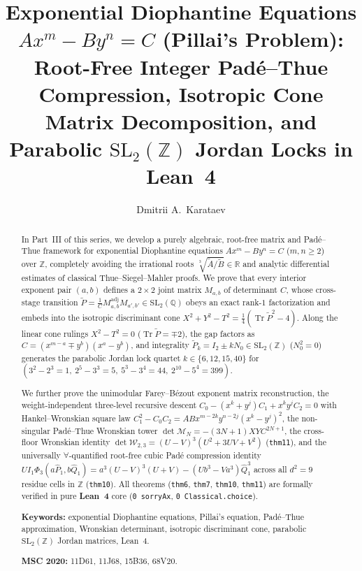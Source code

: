 \documentclass[11pt,a4paper]{article}
\title{\textbf{Exponential Diophantine Equations $A x^m - B y^n = C$ (Pillai's Problem):\\ Root-Free Integer Pad\'e--Thue Compression, Isotropic Cone Matrix Decomposition, and Parabolic $\mathrm{SL}_2(\mathbb{Z})$ Jordan Locks in Lean~4}}
\author{Dmitrii A.~Karataev}
\date{}
\theoremstyle{plain}
\theoremstyle{definition}
\begin{document}
\maketitle

\begin{abstract}
In Part~III of this series, we develop a purely algebraic, root-free matrix and Pad\'e--Thue framework for exponential Diophantine equations $A x^m - B y^n = C$ ($m,n\ge 2$) over $\mathbb{Z}$, completely avoiding the irrational roots $\sqrt[3]{\widetilde{A}/\widetilde{B}}\in\mathbb{R}$ and analytic differential estimates of classical Thue--Siegel--Mahler proofs. We prove that every interior exponent pair $(a,b)$ defines a $2\times 2$ joint matrix $M_{a,b}$ of determinant $C$, whose cross-stage transition $\widetilde{P} = \frac{1}{C}M_{a,b}^{\mathrm{adj}}M_{a',b'}\in\mathrm{SL}_2(\mathbb{Q})$ obeys an exact rank-$1$ factorization and embeds into the isotropic discriminant cone $X^2 + Y^2 - T^2 = \frac{1}{4}(\operatorname{Tr}\widetilde{P}^2 - 4)$. Along the linear cone rulings $X^2 - T^2 = 0$ ($\operatorname{Tr}\widetilde{P} = \mp 2$), the gap factors as $C = (x^{m-a}\mp y^b)(x^a - y^b)$, and integrality $\widetilde{P}_k = I_2 \pm k N_0\in\mathrm{SL}_2(\mathbb{Z})$ ($N_0^2 = 0$) generates the parabolic Jordan lock quartet $k\in\{6,12,15,40\}$ for $(3^2-2^3=1,\ 2^5-3^3=5,\ 5^3-3^4=44,\ 2^{10}-5^4=399)$.

We further prove the unimodular Farey--B\'ezout exponent matrix reconstruction, the weight-independent three-level recursive descent $C_0 - (x^k+y^j)C_1 + x^k y^j C_2 = 0$ with Hankel--Wronskian square law $C_1^2 - C_0 C_2 = A B x^{m-2k}y^{n-2j}(x^k-y^j)^2$, the non-singular Pad\'e--Thue Wronskian tower $\det\mathcal{M}_N = -(3N+1)X Y C^{2N+1}$, the cross-floor Wronskian identity $\det\mathcal{W}_{2,3} = (U-V)^3(U^2+3UV+V^2)$ (\texttt{thm11}), and the universally $\forall$-quantified root-free cubic Pad\'e compression identity $U I_1 \Phi_3(a\widehat{P}_1, b\widehat{Q}_1) = a^3(U-V)^3(U+V) - (U b^3 - V a^3)\widehat{Q}_1^3$ across all $d^2=9$ residue cells in $\mathbb{Z}$ (\texttt{thm10}). All theorems (\texttt{thm6}, \texttt{thm7}, \texttt{thm10}, \texttt{thm11}) are formally verified in pure \textbf{Lean~4} core (\texttt{0 sorryAx}, \texttt{0 Classical.choice}).

\medskip\noindent
\textbf{Keywords:} exponential Diophantine equations, Pillai's equation, Pad\'e--Thue approximation, Wronskian determinant, isotropic discriminant cone, parabolic $\mathrm{SL}_2(\mathbb{Z})$ Jordan matrices, Lean~4.

\smallskip\noindent
\textbf{MSC 2020:} 11D61, 11J68, 15B36, 68V20.
\end{abstract}
\end{document}
